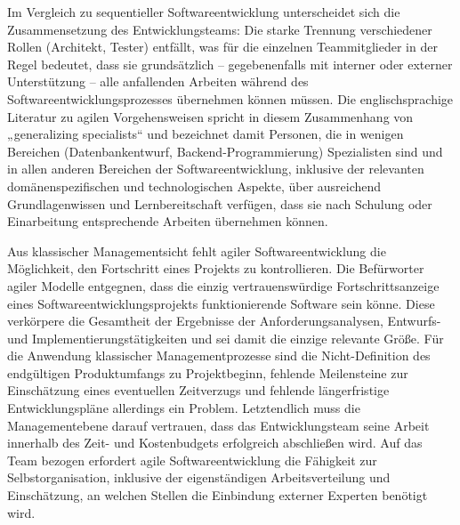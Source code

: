 Im Vergleich zu sequentieller Softwareentwicklung unterscheidet sich die Zusammensetzung des Entwicklungsteams: Die starke Trennung verschiedener Rollen (\zb Architekt, Tester) entfällt, was für die einzelnen Teammitglieder in der Regel bedeutet, dass sie grundsätzlich – gegebenenfalls mit interner oder externer Unterstützung – alle anfallenden Arbeiten während des Softwareentwicklungsprozesses übernehmen können müssen. Die englischsprachige Literatur zu agilen Vorgehensweisen spricht in diesem Zusammenhang von „generalizing specialists“ \cite[35]{amb11} und bezeichnet damit Personen, die in wenigen Bereichen (\zb Datenbankentwurf, Backend-Programmierung) Spezialisten sind und in allen anderen Bereichen der Softwareentwicklung, inklusive der relevanten domänenspezifischen und technologischen Aspekte, über ausreichend Grundlagenwissen und Lernbereitschaft verfügen, dass sie nach Schulung oder Einarbeitung entsprechende Arbeiten übernehmen können.


Aus klassischer Managementsicht fehlt agiler Softwareentwicklung die Möglichkeit, den Fortschritt eines Projekts zu kontrollieren. Die Befürworter agiler Modelle entgegnen, dass die einzig vertrauenswürdige Fortschrittsanzeige eines Softwareentwicklungsprojekts funktionierende Software sein könne. Diese verkörpere die Gesamtheit der Ergebnisse der Anforderungsanalysen, Entwurfs- und Implementierungstätigkeiten und sei damit die einzige relevante Größe. Für die Anwendung klassischer Managementprozesse sind die Nicht-Definition des endgültigen Produktumfangs zu Projektbeginn, fehlende Meilensteine zur Einschätzung eines eventuellen Zeitverzugs und fehlende längerfristige Entwicklungspläne allerdings ein Problem. Letztendlich muss die Managementebene darauf vertrauen, dass das Entwicklungsteam seine Arbeit innerhalb des Zeit- und Kostenbudgets erfolgreich abschließen wird. Auf das Team bezogen erfordert agile Softwareentwicklung die Fähigkeit zur Selbstorganisation, inklusive der eigenständigen Arbeitsverteilung und Einschätzung, an welchen Stellen die Einbindung externer Experten benötigt wird. 



